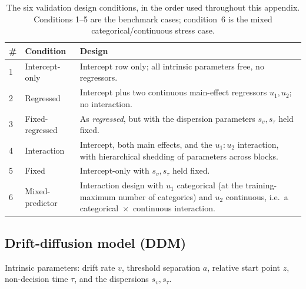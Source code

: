 \begin{table}[htbp]
  \centering
  \small
  \begin{tabular}{@{}llp{7.6cm}@{}}
    \toprule
    \# & Condition & Design \\
    \midrule
    1 & Intercept-only    & Intercept row only; all intrinsic parameters free,
                            no regressors. \\
    2 & Regressed         & Intercept plus two continuous main-effect
                            regressors $u_1, u_2$; no interaction. \\
    3 & Fixed-regressed   & As \emph{regressed}, but with the dispersion
                            parameters $s_v, s_\tau$ held fixed. \\
    4 & Interaction       & Intercept, both main effects, and the
                            $u_1{:}u_2$ interaction, with hierarchical
                            shedding of parameters across blocks. \\
    5 & Fixed             & Intercept-only with $s_v, s_\tau$ held fixed. \\
    6 & Mixed-predictor   & Interaction design with $u_1$ categorical (at the
                            training-maximum number of categories) and $u_2$
                            continuous, i.e.\ a categorical~$\times$~continuous
                            interaction. \\
    \bottomrule
  \end{tabular}
  \caption{The six validation design conditions, in the order used throughout
    this appendix. Conditions 1--5 are the benchmark cases; condition~6 is the
    mixed categorical/continuous stress case.}
  \label{tab:e1-conditions}
\end{table}

\FloatBarrier
\clearpage

\subsection{Drift-diffusion model (DDM)}
\label{sec:e1-ddm}

Intrinsic parameters: drift rate $v$, threshold separation $a$, relative start
point $z$, non-decision time $\tau$, and the dispersions $s_v, s_\tau$.


